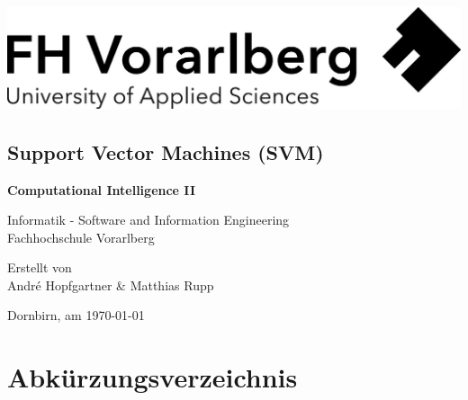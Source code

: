 \documentclass[a4paper,11pt,twoside]{scrreprt}
\begin{document}
\cleardoublepage   %
\thispagestyle{empty}
\begin{titlepage}
  \begin{flushright}
  \includegraphics[width=0.4\linewidth]{assets/Logo-A3.jpg}
  \end{flushright}
  \begin{center}
  \section*{Support Vector Machines (SVM)}
  \vspace{2cm}

\textbf{Computational Intelligence II}    
\vspace{0.5cm}

  Informatik - Software and Information Engineering\\
  Fachhochschule Vorarlberg\\

  \vspace{1cm}
  
    Erstellt von\\
  André Hopfgartner \& Matthias Rupp\\
  
 
  \vspace{1cm}
  

  
  Dornbirn, am \today
  
  
  \end{center}
\end{titlepage}


\clearpage   %
\setcounter{tocdepth}{2}
\setcounter{secnumdepth}{4}
\tableofcontents

\clearpage
{}
{}
\chapter*{Abkürzungsverzeichnis}
\begin{acronym}
\end{acronym}
\end{document}
